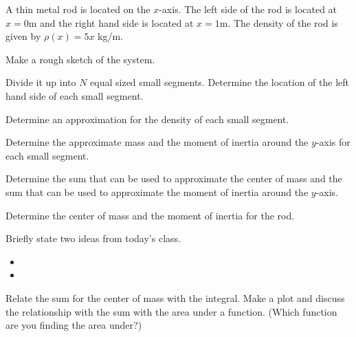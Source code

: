 \begin{problem}
\item A thin metal rod is located on the $x$-axis. The left side of
  the rod is located at $x=0$m and the right hand side is located at
  $x=1$m. The density of the rod is given by $\rho(x)=5x$ kg/m.
  \begin{subproblem}
    \item Make a rough sketch of the system.
      \vfill
    \item Divide it up into $N$ equal sized small segments. Determine
      the location of the left hand side of each small segment.
      \vfill
    \item Determine an approximation for the density of each small
      segment.
      \vfill
    \item Determine the approximate mass and the moment of inertia
      around the $y$-axis for each small segment.
      \vfill

      \clearpage

    \item Determine the sum that can be used to approximate the center
      of mass and the sum that can be used to approximate the moment
      of inertia around the $y$-axis.

      \vspace{6em}

    \item Determine the center of mass and the moment of inertia for
      the rod.

      \vfill

  \end{subproblem}
\end{problem}

\postClass

\begin{problem}
\item Briefly state two ideas from today's class.
  \begin{itemize}
  \item
  \item
  \end{itemize}
\item Relate the sum for the center of mass with the integral. Make a
  plot and discuss the relationship with the sum with the area under a
  function. (Which function are you finding the area under?)

  \vfill
\end{problem}


